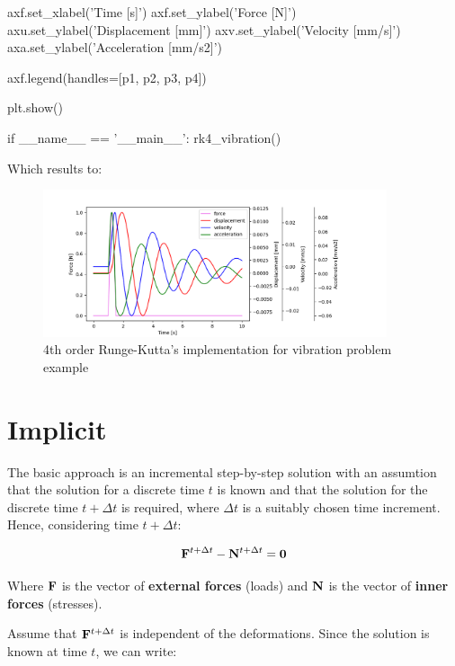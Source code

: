 \begin{python}
    axf.set_xlabel('Time [s]')
    axf.set_ylabel('Force [N]')
    axu.set_ylabel('Displacement [mm]')
    axv.set_ylabel('Velocity [mm/s]')
    axa.set_ylabel('Acceleration [mm/s2]')

    axf.legend(handles=[p1, p2, p3, p4])

    plt.show()

if __name__ == '__main__':
    rk4_vibration()

\end{python}

Which results to:
\begin{figure}[ht]
    \centering
    \includegraphics[width=0.90\textwidth]{img/rk4_example.png}
    \caption{4th order Runge-Kutta's implementation for vibration problem example}
    \label{fig:rk4-example-png}
\end{figure}



\newpage
\section{Implicit}

The basic approach is an incremental step-by-step solution with an assumtion
that the solution for a discrete time $ t $ is known and that the solution for
the discrete time $ t + \Delta t $ is required, where $ \Delta t $ is
a suitably chosen time increment. Hence, considering time $ t + \Delta t $:

\begin{equation}\label{implicit-equation}
    \mathbf{F}^{t + \Delta t} - \mathbf{N}^{t + \Delta t} = \mathbf{0}
\end{equation}

Where $ \mathbf{F} $ is the vector of \textbf{external forces} (loads) and $ \mathbf{N} $
is the vector of \textbf{inner forces} (stresses).

Assume that $ \mathbf{F}^{t + \Delta t} $ is independent of the deformations.
Since the solution is known at time $ t $, we can write:

